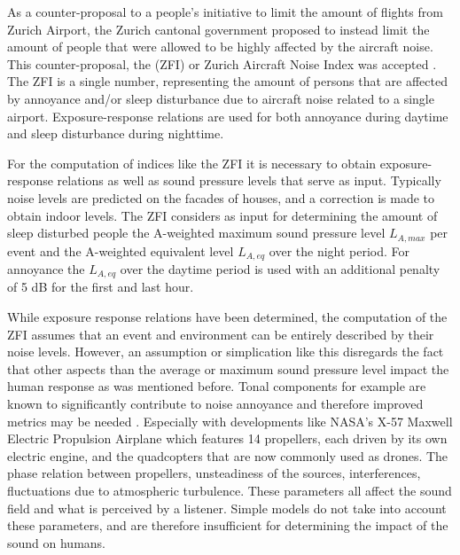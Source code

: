 As a counter-proposal to a people's initiative to limit the amount of flights
from Zurich Airport, the Zurich cantonal government proposed to instead limit
the amount of people that were allowed to be highly affected by the aircraft
noise. This counter-proposal, the  (ZFI) or Zurich
Aircraft Noise Index was accepted \cite{Schaffer2012}. The ZFI is a single
number, representing the amount of persons that are affected by annoyance and/or
sleep disturbance due to aircraft noise related to a single airport.
Exposure-response relations are used for both annoyance during daytime and sleep
disturbance during nighttime.

For the computation of indices like the ZFI it is necessary to obtain
exposure-response relations as well as sound pressure levels that serve as
input. Typically noise levels are predicted on the facades of houses, and a
correction is made to obtain indoor levels. The ZFI considers as input for
determining the amount of sleep disturbed people the A-weighted maximum sound
pressure level $L_{A,max}$ per event and the A-weighted equivalent level
$L_{A,eq}$ over the night period. For annoyance the $L_{A,eq}$ over the daytime
period is used with an additional penalty of 5 dB for the first and last hour.

While exposure response relations have been determined, the computation of the
ZFI assumes that an event and environment can be entirely described by their
noise levels. However, an assumption or simplication like this disregards the
fact that other aspects than the average or maximum sound pressure level impact
the human response as was mentioned before. Tonal components for example are
known to significantly contribute to noise annoyance and therefore improved
metrics may be needed \cite{Sahai2016,Sahai2016b}. Especially with developments
like NASA's X-57 Maxwell Electric Propulsion Airplane
\cite{Moore2012,Beutel2016} which features 14 propellers, each driven by its own
electric engine, and the quadcopters \cite{Rizzi2015} that are now commonly used
as drones. The phase relation between propellers, unsteadiness of the sources,
interferences, fluctuations due to atmospheric turbulence. These parameters all
affect the sound field and what is perceived by a listener. Simple
models do not take into account these parameters, and are therefore insufficient
for determining the impact of the sound on humans.


